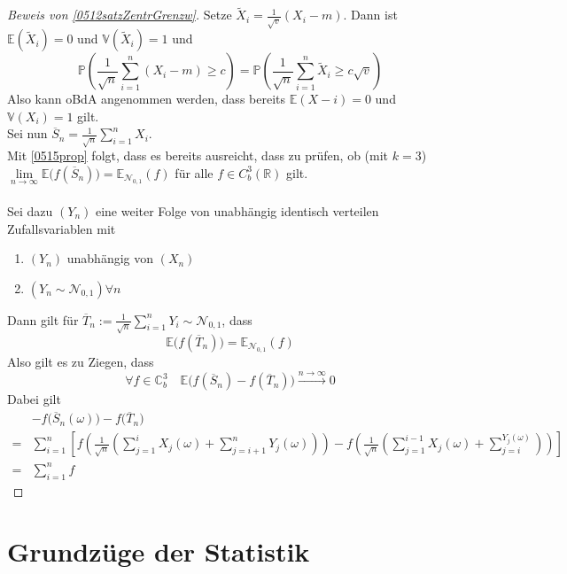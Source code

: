 \documentclass[10pt,a4paper]{article}
\newcommand{\R}{\ensuremath{\mathbb{R}}}
\newcommand{\C}{\ensuremath{\mathbb{C}}}
\newcommand{\ol}[1]{\overline{#1}}
\newcommand{\Prb}{\mathbb P}
\newcommand{\Epv}{\ensuremath{\mathbb{E}}}
\newcommand{\Var}{\mathbb{V}}
\newcommand{\Nv}{\mathscr N}
\theoremstyle{plain}
\theoremstyle{definition}
\theoremstyle{remark}
\begin{document}
	\begin{proof}[Beweis von \ref{0512satzZentrGrenzw}]
		Setze $\tilde X_i=\frac{1}{\sqrt{v}}\left(X_i-m\right)$. Dann ist $\Epv(\tilde X_i)=0$ und $\Var(\tilde X_i)=1$ und
		\[\Prb\left(\frac{1}{\sqrt{n}}\sum_{i=1}^{n}(X_i-m)\geq c\right)=\Prb\left(\frac{1}{\sqrt{n}}\sum_{i=1}^{n}\tilde X_i\geq c\sqrt{v}\right)\]
		Also kann oBdA angenommen werden, dass bereits $\Epv(X-i)=0$ und $\Var(X_i)=1$ gilt.\\
		Sei nun $\ol{S}_n=\frac{1}{\sqrt{n}}\sum_{i=1}^{n}X_i$.\\
		Mit \ref{0515prop} folgt, dass es bereits ausreicht, dass zu prüfen, ob (mit $k=3$) $\lim\limits_{n\to\infty}\Epv\big(f(\ol{S}_n)\big)=\Epv_{\Nv_{0,1}}(f)$ für alle $f\in C^3_b(\R)$ gilt.\\
		\\
		Sei dazu $(Y_n)$ eine weiter Folge von unabhängig identisch verteilen Zufallsvariablen mit
		\begin{enumerate}
			\item $(Y_n)$ unabhängig von $(X_n)$
			\item $(Y_n\sim\Nv_{0,1})\forall n$
		\end{enumerate}
		Dann gilt für $\ol T_n:=\frac{1}{\sqrt{n}}\sum_{i=1}^{n}Y_i\sim\Nv_{0,1}$, dass
		\[\Epv\big(f(\ol T_n)\big)=\Epv_{\Nv_{0,1}}(f)\]
		Also gilt es zu Ziegen, dass
		\[\forall f\in\C^3_b\quad\Epv\big(f(\ol S_n)-f(\ol T_n)\big)\xrightarrow{n\to\infty}0\]
		Dabei gilt
		\begin{align*}
		&-f\big(\ol S_n(\omega)\big)-f\big(\ol T_n\big)\\
		=&\sum_{i=1}^{n}\left[f\left (\frac{1}{\sqrt{n}}\left(\sum_{j=1}^{i}X_j(\omega)+\sum_{j=i+1}^{n}Y_j(\omega)\right)\right)
		-f\left(\frac{1}{\sqrt{n}}\left(\sum_{j=1}^{i-1}X_j(\omega)+\sum_{j=i}^{Y_j(\omega)}\right)\right)\right]\\
		=&\sum_{i=1}^{n}f %
		\end{align*}
	\end{proof}

\section{Grundzüge der Statistik}
\end{document}
